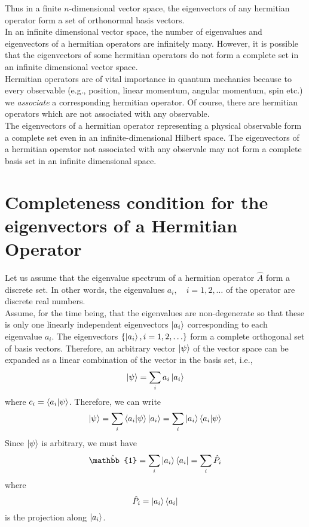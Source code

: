	Thus in a finite $n$-dimensional vector space, the eigenvectors of any hermitian operator form a set of orthonormal basis vectors.\\
	
	In an infinite dimensional vector space, the number of eigenvalues and eigenvectors of a hermitian operators are infinitely many. However, it is possible that the eigenvectors of some hermitian operators do not form a complete set in an infinite dimensional vector space.\\
	
	
	Hermitian operators are of vital importance in quantum mechanics because to every observable (e.g., position, linear momentum, angular momentum, spin etc.) we \textit{associate} a corresponding hermitian operator. Of course, there are hermitian operators which are not associated with any observable.\\
	
	The eigenvectors of a hermitian operator representing a physical observable form a complete set even in an infinite-dimensional Hilbert space. The eigenvectors of a hermitian operator not associated with any observale may not form a complete basis set in an infinite dimensional space.\\
	
	
	
	\section{Completeness condition for the eigenvectors of a Hermitian Operator}
	Let us assume that the eigenvalue spectrum of a hermitian operator $\hat{A}$ form a discrete set. In other words, the eigenvalues $a_i,\quad i=1,2,\ldots$ of the operator are discrete real numbers.\\
	
	Assume, for the time being, that the eigenvalues are non-degenerate so that these is only one linearly independent eigenvectors $\ket{a_i}$ corresponding to each eigenvalue $a_i$. The eigenvectors $\{\ket{a_i}, i=1,2,\ldots\}$ form a complete orthogonal set of basis vectors. Therefore, an arbitrary vector $\ket{\psi}$ of the vector space can be expanded as a linear combination of the vector in the basis set, i.e.,
	\begin{equation}
		\ket{\psi} = \sum_{i} a_i \ket{a_i}
	\end{equation}
	where $c_i = \braket{a_i}{\psi}$. Therefore, we can write
	\begin{equation}
		\ket{\psi} = \sum_i \braket{a_i}{\psi} \ket{a_i} = \sum_i \ket{a_i}\braket{a_i}{\psi}
	\end{equation}
	Since $\ket{\psi}$ is arbitrary, we must have
	\begin{equation}
		\hat{\mathbb{1}} = \sum_i \ket{a_i}\bra{a_i} = \sum_i \hat{P}_i
		\label{chapter5.eqn1-completeness}
	\end{equation}
	where
	\begin{equation}
		\hat{P}_i = \ket{a_i}\bra{a_i}
		\label{chapter5.eqn2-projection}
	\end{equation}
	is the projection along $\ket{a_i}$.\\
	
